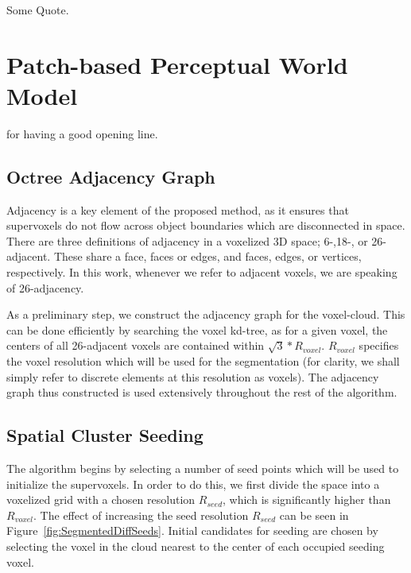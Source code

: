 \begin{savequote}[75mm]
Some Quote.
\end{savequote}


\chapter{Patch-based Perceptual World Model}
 for having a good opening line. 
\section{Octree Adjacency Graph}
\label{subsec:Adjacency}
Adjacency is a key element of the proposed method, as it ensures that supervoxels do not flow across object boundaries which are disconnected in space. There are three definitions of adjacency in a voxelized 3D space; 6-,18-, or 26-adjacent. These share a face, faces or edges, and faces, edges, or vertices, respectively. In this work, whenever we refer to adjacent voxels, we are speaking of 26-adjacency. 

As a preliminary step, we construct the adjacency graph for the voxel-cloud. This can be done efficiently by searching the voxel kd-tree, as for a given voxel, the centers of all 26-adjacent voxels are contained within $\sqrt{3}*R_{voxel}$. ${R}_{voxel}$ specifies the voxel resolution which will be used for the segmentation (for clarity, we shall simply refer to discrete elements at this resolution as voxels). The adjacency graph thus constructed is used extensively throughout the rest of the algorithm.

\section{Spatial Cluster Seeding}
\label{subsec:Seeding}
The algorithm begins by selecting a number of seed points which will be used to initialize the supervoxels. In order to do this, we first divide the space into a voxelized grid with a chosen resolution ${R}_{seed}$, which is significantly higher than ${R}_{voxel}$. The effect of increasing the seed resolution ${R}_{seed}$ can be seen in Figure~\ref{fig:SegmentedDiffSeeds}. Initial candidates for seeding are chosen by selecting the voxel in the cloud nearest to the center of each occupied seeding voxel.    




